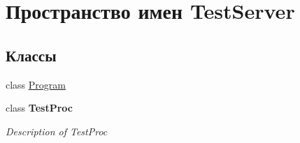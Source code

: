 \hypertarget{namespace_test_server}{}\section{Пространство имен Test\+Server}
\label{namespace_test_server}
\subsection*{Классы}
\begin{DoxyCompactItemize}
\item 
class \hyperlink{class_test_server_1_1_program}{Program}
\item 
class {\bfseries Test\+Proc}
\begin{DoxyCompactList}\small\item\em Description of Test\+Proc \end{DoxyCompactList}\end{DoxyCompactItemize}
